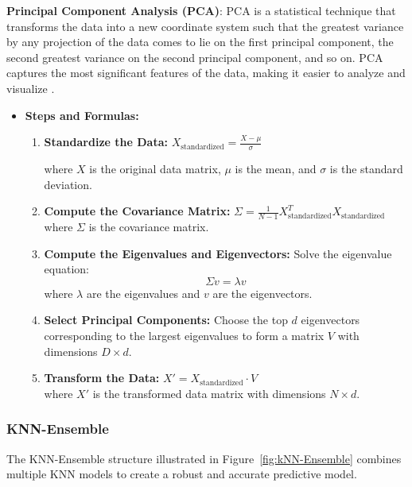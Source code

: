 \documentclass[a4paper]{article}
\begin{document}
\textbf{Principal Component Analysis (PCA)}: PCA is a statistical technique that transforms the data into a new coordinate system such that the greatest variance by any projection of the data comes to lie on the first principal component, the second greatest variance on the second principal component, and so on. PCA captures the most significant features of the data, making it easier to analyze and visualize \citep{PCA}.

\begin{itemize}
    \item \textbf{Steps and Formulas:}
    \begin{enumerate}
        \item \textbf{Standardize the Data:} \( X_{\text{standardized}} = \frac{X - \mu}{\sigma} \) 
        
        where \( X \) is the original data matrix, \( \mu \) is the mean, and \( \sigma \) is the standard deviation.
        
        \item \textbf{Compute the Covariance Matrix:} \( \Sigma = \frac{1}{N-1} X_{\text{standardized}}^T X_{\text{standardized}} \) \\
        where \( \Sigma \) is the covariance matrix.
        
        \item \textbf{Compute the Eigenvalues and Eigenvectors:} Solve the eigenvalue equation:
        \[
        \Sigma v = \lambda v
        \]
        where \( \lambda \) are the eigenvalues and \( v \) are the eigenvectors.
        
        \item \textbf{Select Principal Components:} Choose the top \( d \) eigenvectors corresponding to the largest eigenvalues to form a matrix \( V \) with dimensions \( D \times d \).
        
        \item \textbf{Transform the Data:} \( X' = X_{\text{standardized}} \cdot V \) \\
        where \( X' \) is the transformed data matrix with dimensions \( N \times d \).
    \end{enumerate}
\end{itemize}


\subsubsection{KNN-Ensemble}
The KNN-Ensemble structure illustrated in Figure~\ref{fig:kNN-Ensemble} combines multiple KNN models to create a robust and accurate predictive model.
\end{document}
